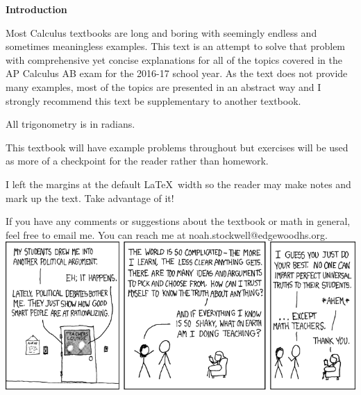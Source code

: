 \par \textbf{Introduction}
\newline
\vspace{0.125in}
\par Most Calculus textbooks are long and boring with seemingly endless and sometimes meaningless examples. This text is an attempt to solve that problem with comprehensive yet concise explanations for all of the topics covered in the AP Calculus AB exam for the 2016-17 school year. As the text does not provide many examples, most of the topics are presented in an abstract way and I strongly recommend this text be supplementary to another textbook.\\\par All trigonometry is in radians.\\\par This textbook will have example problems throughout but exercises will be used as more of a checkpoint for the reader rather than homework.\\\par I left the margins at the default \LaTeX\, width so the reader may make notes and mark up the text. Take advantage of it!\\\par If you have any comments or suggestions about the textbook or math in general, feel free to email me. You can reach me at noah.stockwell@edgewoodhs.org.
\vfill
\includegraphics[width=\textwidth]{images/teachers.png}
\vfill
